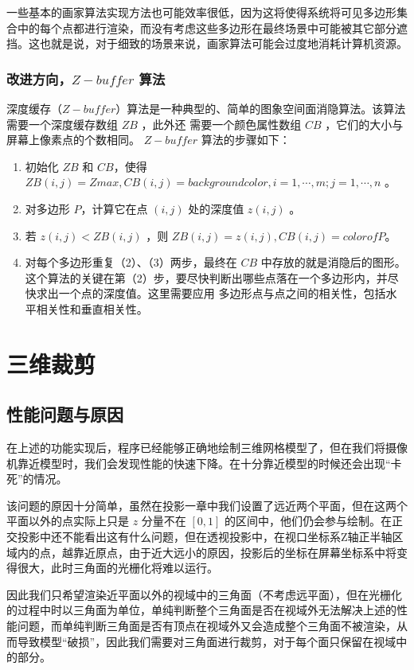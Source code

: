 \documentclass[12pt,oneside,a4paper]{ctexart}
\begin{document}
一些基本的画家算法实现方法也可能效率很低，因为这将使得系统将可见多边形集合中的每个点都进行渲染，而没有考虑这些多边形在最终场景中可能被其它部分遮挡。这也就是说，对于细致的场景来说，画家算法可能会过度地消耗计算机资源。
\subsubsection{改进方向，$Z-buffer$ 算法}
深度缓存（$Z-buffer$）算法是一种典型的、简单的图象空间面消隐算法。\cite{ref2}该算法需要一个深度缓存数组 $ZB$ ，此外还 需要一个颜色属性数组 $CB$ ，它们的大小与屏幕上像素点的个数相同。 $Z-buffer$ 算法的步骤如下：
\begin{enumerate}
	\item 初始化 $ZB$ 和 $CB$，使得 $ZB(i,j)=Zmax,CB(i,j)=backgroundcolor, i=1,\cdots ,m; j=1,\cdots,n$ 。
	\item 对多边形 $P$，计算它在点 $(i,j)$ 处的深度值 $z(i,j)$ 。
	\item 若 $z(i,j)<ZB(i,j)$ ，则 $ZB(i,j)=z(i,j),CB(i,j)=color of P$。
	\item 对每个多边形重复（2）、（3）两步，最终在 $CB$ 中存放的就是消隐后的图形。 这个算法的关键在第（2）步，要尽快判断出哪些点落在一个多边形内，并尽快求出一个点的深度值。这里需要应用 多边形点与点之间的相关性，包括水平相关性和垂直相关性。
\end{enumerate}

\section{三维裁剪}
\subsection{性能问题与原因}
在上述的功能实现后，程序已经能够正确地绘制三维网格模型了，但在我们将摄像机靠近模型时，我们会发现性能的快速下降。在十分靠近模型的时候还会出现“卡死”的情况。

该问题的原因十分简单，虽然在投影一章中我们设置了远近两个平面，但在这两个平面以外的点实际上只是 $z$ 分量不在 $[0,1]$ 的区间中，他们仍会参与绘制。在正交投影中还不能看出这有什么问题，但在透视投影中，在视口坐标系Z轴正半轴区域内的点，越靠近原点，由于近大远小的原因，投影后的坐标在屏幕坐标系中将变得很大，此时三角面的光栅化将难以运行。

因此我们只希望渲染近平面以外的视域中的三角面（不考虑远平面），但在光栅化的过程中时以三角面为单位，单纯判断整个三角面是否在视域外无法解决上述的性能问题，而单纯判断三角面是否有顶点在视域外又会造成整个三角面不被渲染，从而导致模型“破损”，因此我们需要对三角面进行裁剪，对于每个面只保留在视域中的部分。
\end{document}
